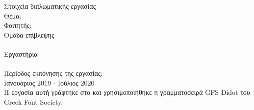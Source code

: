 \pagestyle{empty}
\begin{center}
\Large{Στοιχεία διπλωματικής εργασίας}\\[1cm]
{\large Θέμα:}
\textbf{\large \doctitle}\\[1cm]
\large {Φοιτητής: \textbf{\nomme}\\[1cm]
\large{Ομάδα επίβλεψης}\\
\textbf{\suptitle \, \supname}\\
Εργαστήρια\\
\lab \\[1cm]
Περίοδος εκπόνησης της εργασίας:\\ Ιανουάριος 2019 - Ιούλιος 2020\\[1cm]
Η εργασία αυτή γράφτηκε στο \XeLaTeX{} και χρησιμοποιήθηκε η γραμματοσειρά GFS Didot του Greek Font Society.}
\end{center}